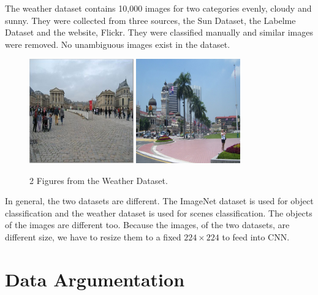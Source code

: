 The weather dataset \citep{lutwo} contains 10,000 images for two categories evenly, cloudy and sunny. They were collected from three sources, the Sun Dataset\citep{russell2008labelme}, the Labelme Dataset\citep{xiao2010sun} and the website, Flickr. They were classified manually and similar images were removed. No unambiguous images exist in the dataset.
\graphicspath{ {./Figures/} }
\begin{figure}[!htb]
    \centering
	\includegraphics[width=0.4\textwidth]{cloudy_0001.png}
    \qquad
    \includegraphics[width=0.4\textwidth]{sunny_0003.png}
    \caption{2 Figures from the Weather Dataset\citep{lutwo}.}%
    \label{fig:WeatherExamples}%
\end{figure}

In general, the two datasets are different. The ImageNet dataset is used for object classification and the weather dataset is used for scenes classification. The objects of the images are different too. Because the images, of the two datasets, are different size, we have to resize them to a fixed $224 \times 224$ to feed into CNN.

\section{Data Argumentation}

